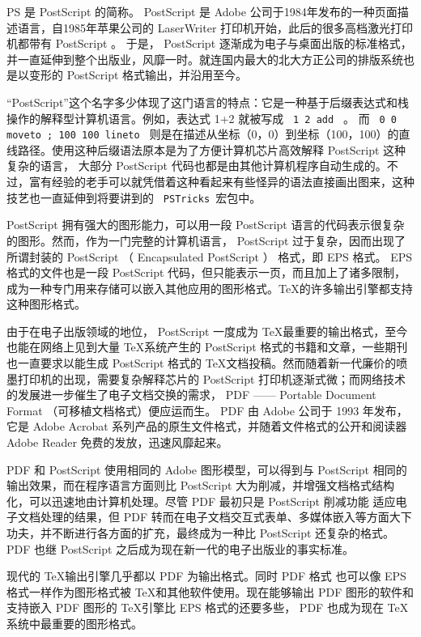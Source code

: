 {
    \qquad PS 是 PostScript 的简称。 PostScript 是 Adobe 公司于1984年发布的一种页面描述语言，自1985年苹果公司的 LaserWriter 打印机开始，此后的很多高档激光打印机都带有 PostScript 。 于是， PostScript 逐渐成为电子与桌面出版的标准格式，并一直延伸到整个出版业，风靡一时。就连国内最大的北大方正公司的排版系统也是以变形的 PostScript 格式输出，并沿用至今。

    \qquad “PostScript”这个名字多少体现了这门语言的特点：它是一种基于后缀表达式和栈操作的解释型计算机语言。例如，表达式 1+2 就被写成 \lstinline{ 1 2 add } 。 而 \lstinline{ 0 0 moveto ; 100 100 lineto } 则是在描述从坐标（0，0）到坐标（100，100）的直线路径。使用这种后缀语法原本是为了方便计算机芯片高效解释 PostScript 这种复杂的语言， 大部分 PostScript 代码也都是由其他计算机程序自动生成的。不过，富有经验的老手可以就凭借着这种看起来有些怪异的语法直接画出图来，这种技艺也一直延伸到将要讲到的 \lstinline{ PSTricks }宏包中。

    \qquad PostScript 拥有强大的图形能力，可以用一段 PostScript 语言的代码表示很复杂的图形。然而，作为一门完整的计算机语言， PostScript 过于复杂，因而出现了所谓封装的 PostScript （ Encapsulated PostScript ） 格式，即 EPS 格式。 EPS 格式的文件也是一段 PostScript 代码，但只能表示一页，而且加上了诸多限制，成为一种专门用来存储可以嵌入其他应用的图形格式。\TeX 的许多输出引擎都支持这种图形格式。

    \qquad 由于在电子出版领域的地位， PostScript 一度成为 \TeX 最重要的输出格式，至今也能在网络上见到大量 \TeX 系统产生的 PostScript 格式的书籍和文章，一些期刊也一直要求以能生成 PostScript 格式的 \TeX 文档投稿。然而随着新一代廉价的喷墨打印机的出现，需要复杂解释芯片的 PostScript 打印机逐渐式微；而网络技术的发展进一步催生了电子文档交换的需求， PDF —— Portable Document Format （可移植文档格式）便应运而生。 PDF 由 Adobe 公司于 1993 年发布，它是 Adobe Acrobat 系列产品的原生文件格式，并随着文件格式的公开和阅读器 Adobe Reader 免费的发放，迅速风靡起来。

    PDF 和 PostScript 使用相同的 Adobe 图形模型，可以得到与 PostScript 相同的输出效果，而在程序语言方面则比 PostScript 大为削减，并增强文档格式结构化，可以迅速地由计算机处理。尽管 PDF 最初只是 PostScript 削减功能 适应电子文档处理的结果，但 PDF 转而在电子文档交互式表单、多媒体嵌入等方面大下功夫，并不断进行各方面的扩充，最终成为一种比 PostScript 还复杂的格式。 PDF 也继 PostScript 之后成为现在新一代的电子出版业的事实标准。

    \qquad 现代的 \TeX 输出引擎几乎都以 PDF 为输出格式。同时 PDF 格式 也可以像 EPS 格式一样作为图形格式被 \TeX 和其他软件使用。现在能够输出 PDF 图形的软件和支持嵌入 PDF 图形的 \TeX 引擎比 EPS 格式的还要多些， PDF 也成为现在 \TeX 系统中最重要的图形格式。

}

